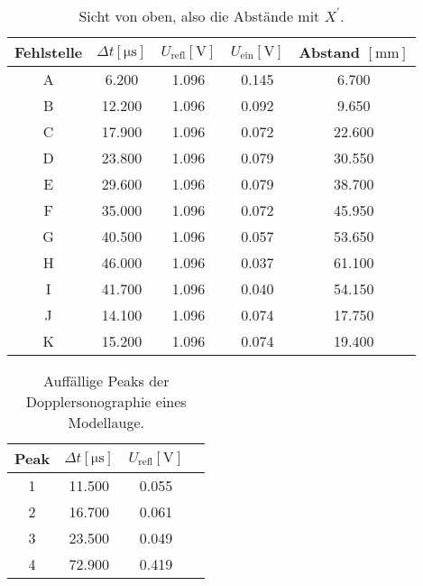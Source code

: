 \begin{table}
    \centering
    \caption{Sicht von oben, also die Abstände mit $X^{'}$.}
    \label{tab:2}
    \begin{tabular}{c | c c c c}
        \toprule
        Fehlstelle & $\Delta t [\si{\micro\second}] $ &  $U_{\text{refl}} [\si{\volt}]$ & $U_{\text{ein}}[\si{\volt}]$ & Abstand $[\si{\milli\meter}]$ \\
        \midrule
        A &    6.200    &   1.096   &    0.145    &    6.700    \\
        B &   12.200    &   1.096   &    0.092    &    9.650    \\
        C &   17.900    &   1.096   &    0.072    &   22.600    \\
        D &   23.800    &   1.096   &    0.079    &   30.550    \\
        E &   29.600    &   1.096   &    0.079    &   38.700    \\
        F &   35.000    &   1.096   &    0.072    &   45.950    \\
        G &   40.500    &   1.096   &    0.057    &   53.650    \\
        H &   46.000    &   1.096   &    0.037    &   61.100    \\
        I &   41.700   &   1.096   &    0.040    &   54.150    \\
        J &   14.100   &   1.096   &    0.074    &   17.750    \\
        K &   15.200   &   1.096   &    0.074    &   19.400    \\
    \end{tabular}
\end{table}


\begin{table}
    \centering
    \caption{Auffällige Peaks der Dopplersonographie eines Modellauge.}
    \label{tab:3}
    \begin{tabular}{c | c c c}
        \toprule
        Peak & $\Delta t [\si{\micro\second}] $ & $U_{\text{refl}} [\si{\volt}]$ \\
        \midrule
        1  &11.500&0.055 \\
        2  &16.700&0.061 \\
        3  &23.500&0.049 \\
        4  &72.900&0.419 \\       
    \end{tabular}
\end{table}

